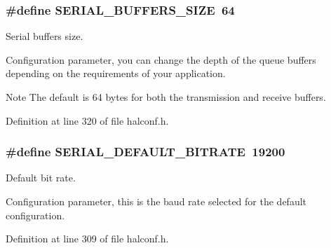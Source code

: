 \subsubsection[{S\+E\+R\+I\+A\+L\+\_\+\+B\+U\+F\+F\+E\+R\+S\+\_\+\+S\+I\+Z\+E}]{\setlength{\rightskip}{0pt plus 5cm}\#define S\+E\+R\+I\+A\+L\+\_\+\+B\+U\+F\+F\+E\+R\+S\+\_\+\+S\+I\+Z\+E~64}\label{group__HAL__CONF_ga81a9fb00c7a1ce0fe70f263d8fd820e8}


Serial buffers size. 

Configuration parameter, you can change the depth of the queue buffers depending on the requirements of your application. \begin{DoxyNote}{Note}
The default is 64 bytes for both the transmission and receive buffers. 
\end{DoxyNote}


Definition at line 320 of file halconf.\+h.

\hypertarget{group__HAL__CONF_gacb4c08ac23f83ac9d58c50ff840de516}{}
\subsubsection[{S\+E\+R\+I\+A\+L\+\_\+\+D\+E\+F\+A\+U\+L\+T\+\_\+\+B\+I\+T\+R\+A\+T\+E}]{\setlength{\rightskip}{0pt plus 5cm}\#define S\+E\+R\+I\+A\+L\+\_\+\+D\+E\+F\+A\+U\+L\+T\+\_\+\+B\+I\+T\+R\+A\+T\+E~19200}\label{group__HAL__CONF_gacb4c08ac23f83ac9d58c50ff840de516}


Default bit rate. 

Configuration parameter, this is the baud rate selected for the default configuration. 

Definition at line 309 of file halconf.\+h.

\hypertarget{group__HAL__CONF_ga36d1818f9631f955f7cc94629b1d5498}{}
